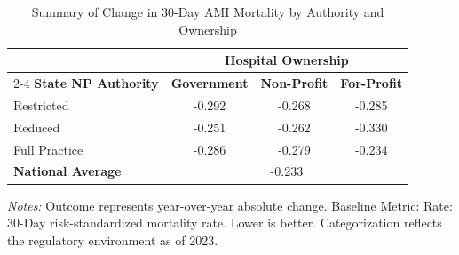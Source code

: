 \begin{table}[htbp]
    \centering
    \caption{Summary of Change in 30-Day AMI Mortality by Authority and Ownership}
    \label{tab:d_mortality_rate_ami_own}
    \vspace{0.2cm}
    \begin{tabular}{lccc}
        \toprule
        & \multicolumn{3}{c}{\textbf{Hospital Ownership}} \\
        \cmidrule(lr){2-4}
        \textbf{State NP Authority} & \textbf{Government} & \textbf{Non-Profit} & \textbf{For-Profit} \\
        \midrule
        Restricted & -0.292 & -0.268 & -0.285 \\
        Reduced & -0.251 & -0.262 & -0.330 \\
        Full Practice & -0.286 & -0.279 & -0.234 \\
        \midrule
        \textbf{National Average} & \multicolumn{3}{c}{-0.233} \\
        \bottomrule
    \end{tabular}
    \vspace{0.1cm}
    \begin{minipage}{0.85\textwidth}
        \footnotesize \textit{Notes:} Outcome represents year-over-year absolute change. Baseline Metric: Rate: 30-Day risk-standardized mortality rate. Lower is better. Categorization reflects the regulatory environment as of 2023.
    \end{minipage}
\end{table}